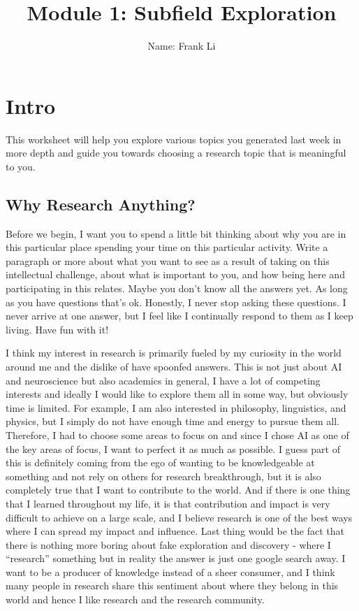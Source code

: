 \documentclass[letterpaper,11pt]{article}
\begin{document}
\title{{\bf Module 1: Subfield Exploration} }
\author{Name: Frank Li}

\date{}
\maketitle

\section{Intro}
This worksheet will help you explore various topics you generated last week in more depth and guide you towards choosing a research topic that is meaningful to you.
\subsection{Why Research Anything?}
Before we begin, I want you to spend a little bit thinking about why you are in this particular place spending your time on this particular activity. Write a paragraph or more about what you want to see as a result of taking on this intellectual challenge, about what is important to you, and how being here and participating in this relates. Maybe you don't know all the answers yet. As long as you have questions that's ok. Honestly, I never stop asking these questions. I never arrive at one answer, but I feel like I continually respond to them as I keep living. Have fun with it!
\begin{tcolorbox}
    I think my interest in research is primarily fueled by my curiosity in the world around me and the
    dislike of have spoonfed answers. This is not just about AI and neuroscience but also academics in general,
    I have a lot of competing interests and ideally I would like to explore them all in some way, but obviously
    time is limited. For example, I am also interested in philosophy, linguistics, and physics, but I simply do
    not have enough time and energy to pursue them all. Therefore, I had to choose some areas to focus on and
    since I chose AI as one of the key areas of focus, I want to perfect it as much as possible.
    I guess part of this is definitely coming from the ego of wanting to be knowledgeable at something and not
    rely on others for research breakthrough, but it is also completely true that I want to contribute to the
    world. And if there is one thing that I learned throughout my life, it is that contribution and impact is
    very difficult to achieve on a large scale, and I believe research is one of the best ways where I can
    spread my impact and influence. Last thing would be the fact that there is nothing more boring about fake
    exploration and discovery - where I ``research'' something but in reality the answer is just one google
    search away. I want to be a producer of knowledge instead of a sheer consumer, and I think many people in
    research share this sentiment about where they belong in this world and hence I like research and the
    research community.
\end{tcolorbox}
\pagebreak
\end{document}
